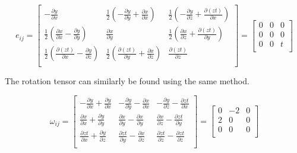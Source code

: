 \documentclass[11pt,a4paper,english]{article}
\numberwithin{equation}{section}
\begin{document}
\[
	e_{ij}=
	\begin{bmatrix}
    	   -\frac{\partial y}{\partial x} & 
	       \frac{1}{2}(- \frac{\partial y}{\partial y} + \frac{\partial x}{\partial x}) & 
	       \frac{1}{2}(- \frac{\partial y}{\partial z} + \frac{\partial (zt)}{\partial x}) \\[0.3em]
       
  	     \frac{1}{2}(\frac{\partial x}{\partial x} - \frac{\partial y}{\partial y}) & 
  	     \frac{\partial x}{\partial y} & 
  	     \frac{1}{2}(\frac{\partial x}{\partial z} + \frac{\partial (zt)}{\partial y}) \\[0.3em]
       
  	     \frac{1}{2}(\frac{\partial (zt)}{\partial x} - \frac{\partial y}{\partial z}) & 
  	     \frac{1}{2}(\frac{\partial (zt)}{\partial y} + \frac{\partial x}{\partial z}) & 
  	     \frac{\partial (zt)}{\partial z} \\[0.3em]
     \end{bmatrix}     
     =\begin{bmatrix}
       0 & 
       0 & 
       0\\[0.3em]
       
       0 & 
       0 & 
       0\\[0.3em]
       
       0 & 
       0 & 
       t\\[0.3em]
     \end{bmatrix}\]
     
The rotation tensor can similarly be found using the same method.     
     
     \[\omega_{ij}=
\begin{bmatrix}
       - \frac{\partial y}{\partial x} + \frac{\partial y}{\partial x} 	& 
       - \frac{\partial y}{\partial y} - \frac{\partial x}{\partial x}	& 
       - \frac{\partial y}{\partial z} - \frac{\partial zt}{\partial x}	\\[0.3em]
       
       \frac{\partial x}{\partial x} + \frac{\partial y}{\partial y} & 
       \frac{\partial x}{\partial y} - \frac{\partial x}{\partial y} & 
       \frac{\partial x}{\partial z} - \frac{\partial zt}{\partial y} \\[0.3em]
      
       \frac{\partial zt}{\partial x} + \frac{\partial y}{\partial z} & 
       \frac{\partial zt}{\partial y} - \frac{\partial x}{\partial z} & 
       \frac{\partial zt}{\partial z} - \frac{\partial zt}{\partial z} \\[0.3em]
     \end{bmatrix}
     =\begin{bmatrix}
       0 & 
       -2 & 
       0\\[0.3em]
       
       2 & 
       0 & 
       0\\[0.3em]
       
       0 & 
       0 & 
       0\\[0.3em]
     \end{bmatrix}\]
\end{document}
